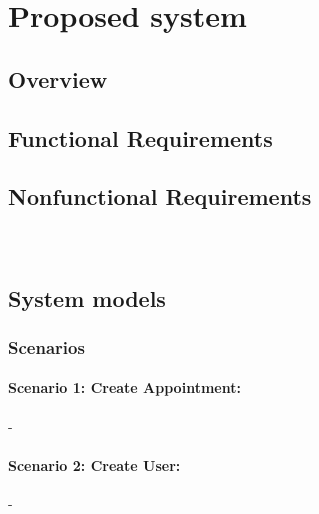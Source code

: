 \documentclass{article}
\begin{document}
\section{Proposed system}
	\subsection{Overview}
	\subsection{Functional Requirements}
	\subsection{Nonfunctional Requirements}				%
		\subsubsection*{}
		\\
	\subsection{System models}							%
		\subsubsection{Scenarios}
			\paragraph{Scenario 1: Create Appointment:}
			 -\\

			\paragraph{Scenario 2: Create User:}
			 -\\
			
\end{document}
